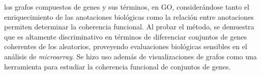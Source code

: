 los grafos compuestos de genes y sus términos, en GO, considerándose tanto el enriquecimiento de las anotaciones biológicas como la relación entre anotaciones permiten determinar la coherencia funcional. Al probar el método, se demuestra que es altamente discriminativo en términos de diferenciar conjuntos de genes coherentes de los aleatorios, proveyendo evaluaciones biológicas sensibles en el análisis de \textit{microarray}. Se hizo uso además de visualizaciones de grafos como una herramienta para estudiar la coherencia funcional de conjuntos de genes.


